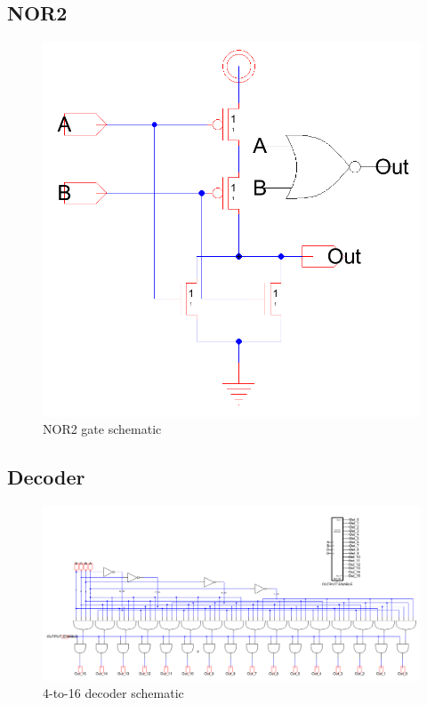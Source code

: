 \documentclass[12pt]{report}
\begin{document}
\subsection*{NOR2}
\begin{figure}[H]
  \centering
    \includegraphics[width=1.0\textwidth]{Schematics/nor_gate_schematic.PNG}
  \caption{NOR2 gate schematic}
  \label{fig:nor_gate_schematic}
\end{figure}

\subsection*{Decoder}
\begin{figure}[H]
  \centering
    \includegraphics[width=1.0\textwidth]{Schematics/decoder_schematic.PNG}
  \caption{4-to-16 decoder schematic}
  \label{fig:decoder_schematic}
\end{figure}
\end{document}
